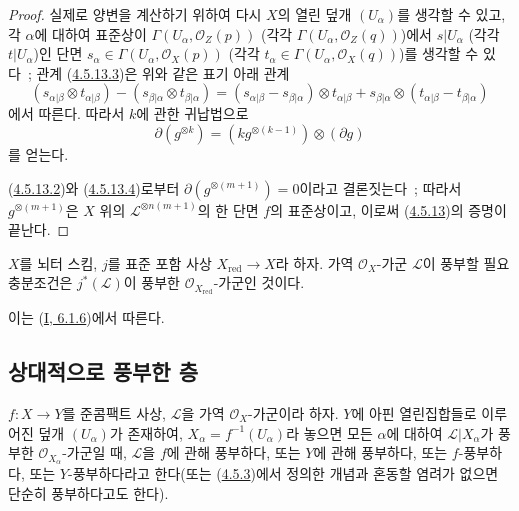 \begin{proof}
실제로 양변을 계산하기 위하여 다시 $X$의 열린 덮개
$(U_\alpha)$를 생각할 수 있고, 각 $\alpha$에 대하여 표준상이
$\Gamma(U_\alpha,\mathcal{O}_Z(p))$ (각각
$\Gamma(U_\alpha,\mathcal{O}_Z(q))$)에서 $s|U_\alpha$ (각각
$t|U_\alpha$)인 단면
$s_\alpha\in\Gamma(U_\alpha,\mathcal{O}_X(p))$ (각각
$t_\alpha\in\Gamma(U_\alpha,\mathcal{O}_X(q))$)를 생각할 수 있다~;
관계 (\hyperref[II.4.5.13.3-ko]{4.5.13.3})은 위와 같은 표기 아래
관계
\[
  (s_{\alpha|\beta}\otimes t_{\alpha|\beta})
  -(s_{\beta|\alpha}\otimes t_{\beta|\alpha})
  =(s_{\alpha|\beta}-s_{\beta|\alpha})\otimes t_{\alpha|\beta}
  +s_{\beta|\alpha}\otimes(t_{\alpha|\beta}-t_{\beta|\alpha})
\]
에서 따른다. 따라서 $k$에 관한 귀납법으로
\begin{equation}
\label{II.4.5.13.4-ko}
  \partial(g^{\otimes k})=(kg^{\otimes(k-1)})\otimes(\partial g)
\tag{4.5.13.4}
\end{equation}
를 얻는다.


(\hyperref[II.4.5.13.2-ko]{4.5.13.2})와
(\hyperref[II.4.5.13.4-ko]{4.5.13.4})로부터
$\partial(g^{\otimes(m+1)})=0$이라고 결론짓는다~; 따라서
$g^{\otimes(m+1)}$은 $X$ 위의 $\mathcal{L}^{\otimes n(m+1)}$의
한 단면 $f$의 표준상이고, 이로써
(\hyperref[II.4.5.13-ko]{4.5.13})의 증명이 끝난다.
\end{proof}

\begin{corollary}[4.5.14]
\label{II.4.5.14-ko}
$X$를 뇌터 스킴, $j$를 표준 포함 사상
$X_{\mathrm{red}}\to X$라 하자. 가역 $\mathcal{O}_X$-가군
$\mathcal{L}$이 풍부할 필요충분조건은 $j^*(\mathcal{L})$이 풍부한
$\mathcal{O}_{X_{\mathrm{red}}}$-가군인 것이다.
\end{corollary}

이는 (\hyperref[I.6.1.6-ko]{I, 6.1.6})에서 따른다.

\subsection{상대적으로 풍부한 층}
\label{II.4.6-ko}

\begin{definition}[4.6.1]
\label{II.4.6.1-ko}
$f:X\to Y$를 준콤팩트 사상, $\mathcal{L}$을 가역
$\mathcal{O}_X$-가군이라 하자. $Y$에 아핀 열린집합들로 이루어진 덮개
$(U_\alpha)$가 존재하여, $X_\alpha=f^{-1}(U_\alpha)$라 놓으면 모든
$\alpha$에 대하여 $\mathcal{L}|X_\alpha$가 풍부한
$\mathcal{O}_{X_\alpha}$-가군일 때, $\mathcal{L}$을 $f$에 관해
풍부하다, 또는 $Y$에 관해 풍부하다, 또는 $f$-풍부하다, 또는
$Y$-풍부하다라고 한다(또는 (\hyperref[II.4.5.3-ko]{4.5.3})에서 정의한
개념과 혼동할 염려가 없으면 단순히 풍부하다고도 한다).
\end{definition}

